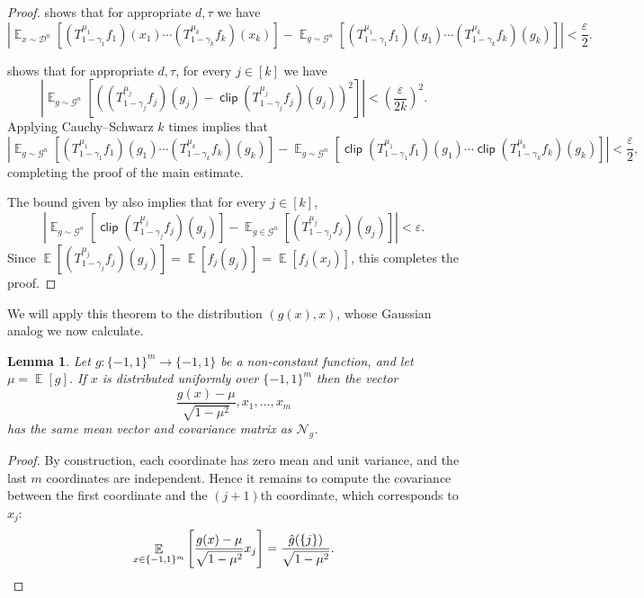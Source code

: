 \documentclass{article}
\newtheorem{lemma}[theorem]{Lemma}
\theoremstyle{definition}
\theoremstyle{remark}
\DeclareMathOperator*{\E}{\mathbb{E}}
\providecommand{\normal}{\mathcal{N}}
\providecommand{\normalg}[1]{\normal_{#1}}
\DeclareMathOperator{\clip}{\mathsf{clip}}
\newcommand\eps{\varepsilon}
\renewcommand\epsilon{\eps}
\begin{document}
\begin{proof}
\cite[Theorem 4.1]{Mossel2010} shows that for appropriate $d,\tau$ we have
\[
 \left|
 \E_{x \sim \mathcal{D}^n}
 [(T_{1-\gamma_1}^{\mu_1} f_1)(x_1) \cdots (T_{1-\gamma_k}^{\mu_k} f_k)(x_k)]
 -
 \E_{g \sim \mathcal{G}^n}
 [(T_{1-\gamma_1}^{\mu_1} f_1)(g_1) \cdots (T_{1-\gamma_k}^{\mu_k} f_k)(g_k)]
 \right| < \frac{\epsilon}{2}.
\]

\cite[Theorem 4.2]{Mossel2010} shows that for appropriate $d,\tau$, for every $j \in [k]$ we have
\[
 \left|
 \E_{g \sim \mathcal{G}^n} [((T_{1-\gamma_j}^{\mu_j} f_j)(g_j) - \clip(T_{1-\gamma_j}^{\mu_j} f_j)(g_j))^2]
 \right| < \left(\frac{\epsilon}{2k}\right)^2.
\]
Applying Cauchy--Schwarz $k$ times implies that
\[
 \left|
 \E_{g \sim \mathcal{G}^n}
 [(T_{1-\gamma_1}^{\mu_1} f_1)(g_1) \cdots (T_{1-\gamma_k}^{\mu_k} f_k)(g_k)]
 -
 \E_{g \sim \mathcal{G}^n}
 [\clip(T_{1-\gamma_1}^{\mu_1} f_1)(g_1) \cdots \clip(T_{1-\gamma_k}^{\mu_k} f_k)(g_k)]
 \right| < \frac{\epsilon}{2},
\]
completing the proof of the main estimate.

The bound given by \cite[Theorem 4.2]{Mossel2010} also implies that for every $j \in [k]$,
\[
 \left|\E_{g \sim \mathcal{G}^n}[\clip(T_{1-\gamma_j}^{\mu_j} f_j)(g_j)] - \E_{g \in \mathcal{G}^n}[(T_{1-\gamma_j}^{\mu_j} f_j)(g_j)]\right| < \epsilon.
\]
Since $\E[(T_{1-\gamma_j}^{\mu_j} f_j)(g_j)] = \E[f_j(g_j)] = \E[f_j(x_j)]$, this completes the proof.
\end{proof}

We will apply this theorem to the distribution $(g(x),x)$, whose Gaussian analog we now calculate.

\begin{lemma} \label{lem:normalg}
Let $g\colon \{-1,1\}^m \to \{-1,1\}$ be a non-constant function, and let $\mu = \E[g]$. If $x$ is distributed uniformly over $\{-1,1\}^m$ then the vector
\[
 \frac{g(x) - \mu}{\sqrt{1 - \mu^2}},x_1,\ldots,x_m
\]
has the same mean vector and covariance matrix as $\normalg{g}$.
\end{lemma}
\begin{proof}
By construction, each coordinate has zero mean and unit variance, and the last $m$ coordinates are independent. Hence it remains to compute the covariance between the first coordinate and the $(j+1)$th coordinate, which corresponds to $x_j$:
\[
 \E_{x \in \{-1,1\}^m} \left[ \frac{g(x) - \mu}{\sqrt{1 - \mu^2}} x_j \right] = \frac{\hat{g}(\{j\})}{\sqrt{1 - \mu^2}}. \qedhere
\]
\end{proof}
\end{document}
